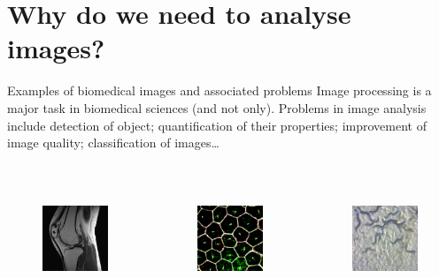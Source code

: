 \documentclass[9pt, aspectratio=169]{beamer}
\begin{document}
\section{Why do we need to analyse images?}

\begin{frame}
    {Examples of biomedical images and associated problems}
    Image processing is a major task in biomedical sciences (and not only).
    Problems in image analysis include detection of object; quantification of their properties; improvement of image quality; classification of images\dots

    \begin{columns}
        \begin{column}{0.25\textwidth}
            \begin{figure}
                \includegraphics[height=10em]{MRI - Becky Stern CC-BY-SA2.jpg}
                \caption{\color{gray}{Becky Stern - CC-BY-SA 2.0}}
            \end{figure}
        \end{column}
        \begin{column}{0.25\textwidth}
            \begin{figure}
                \includegraphics[height=10em]{Retinal pigment epithelium - NIH - CC BY-NC 2.0.jpg}
                \caption{\color{gray}{NIH - CC-BY-SA 2.0}}
            \end{figure}
        \end{column}
        \begin{column}{0.25\textwidth}
            \begin{figure}
                \includegraphics[height=10em]{c elegans - Zeiss - CC-BY 2.0.jpg}

\end{figure}
\end{column}
\end{columns}
\end{frame}
\end{document}
